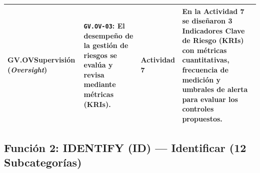 \documentclass[letterpaper,11pt]{article}
\begin{document}
\begin{longtable}{|L{2.8cm}|L{4.5cm}|L{2.9cm}|L{6.5cm}|}
\textbf{GV.OV}\newline Supervisión (\textit{Oversight}) &
\textbf{\texttt{GV.OV-03}}: El desempeño de la gestión de riesgos se evalúa y revisa mediante métricas (KRIs). &
\textbf{Actividad 7} &
En la \textbf{Actividad 7} se diseñaron \textbf{3 Indicadores Clave de Riesgo (KRIs)} con métricas cuantitativas, frecuencia de medición y umbrales de alerta para evaluar los controles propuestos. \\
\hline
\end{longtable}
\endgroup

\subsection{Función 2: IDENTIFY (ID) --- Identificar (12 Subcategorías)}
\end{document}
